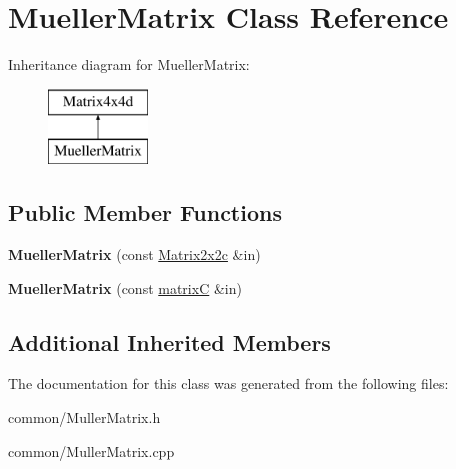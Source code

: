 \hypertarget{class_mueller_matrix}{}\section{Mueller\+Matrix Class Reference}
\label{class_mueller_matrix}
Inheritance diagram for Mueller\+Matrix\+:\begin{figure}[H]
\begin{center}
\leavevmode
\includegraphics[height=2.000000cm]{class_mueller_matrix}
\end{center}
\end{figure}
\subsection*{Public Member Functions}
\begin{DoxyCompactItemize}
\item 
\mbox{\label{class_mueller_matrix_a567e0f446f455f3eec493029c2983dbb}} 
{\bfseries Mueller\+Matrix} (const \mbox{\hyperlink{class_matrix2x2c}{Matrix2x2c}} \&in)
\item 
\mbox{\label{class_mueller_matrix_a13b75f898bb755242ef968cc7a680355}} 
{\bfseries Mueller\+Matrix} (const \mbox{\hyperlink{classmatrix_c}{matrixC}} \&in)
\end{DoxyCompactItemize}
\subsection*{Additional Inherited Members}


The documentation for this class was generated from the following files\+:\begin{DoxyCompactItemize}
\item 
common/Muller\+Matrix.\+h\item 
common/Muller\+Matrix.\+cpp\end{DoxyCompactItemize}

